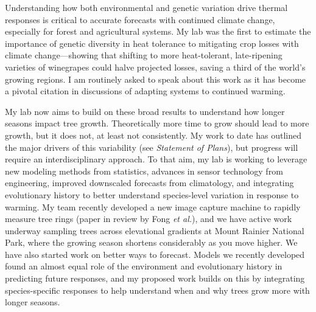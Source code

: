 \documentclass[11pt,letter,oneside]{article}
\begin{document}
Understanding how both environmental and genetic variation drive thermal responses is critical to accurate forecasts with continued climate change, especially for forest and agricultural systems. My lab was the first to estimate the importance of genetic diversity in heat tolerance to mitigating crop losses with climate change---showing that shifting to more heat-tolerant, late-ripening varieties of winegrapes could halve projected losses, saving a third of the world's growing regions. I am routinely asked to speak about this work as it has become a pivotal citation in discussions of adapting systems to continued warming.

My lab now aims to build on these broad results to understand how longer seasons impact tree growth. Theoretically more time to grow should lead to more growth, but it does not, at least not consistently. My work to date has outlined the major drivers of this variability (see \emph{Statement of Plans}), but progress will require an interdisciplinary approach. To that aim, my lab is working to leverage new modeling methods from statistics, advances in sensor technology from engineering, improved downscaled forecasts from climatology, and integrating evolutionary history to better understand species-level variation in response to warming. My team recently developed a new image capture machine to rapidly measure tree rings (paper in review by Fong \emph{et al.}), and we have active work underway sampling trees across elevational gradients at Mount Rainier National Park, where the growing season shortens considerably as you move higher. We have also started work on better ways to forecast. Models we recently developed found an almost equal role of the environment and evolutionary history in predicting future responses, and my proposed work builds on this by integrating species-specific responses to help understand when and why trees grow more with longer seasons. 
\end{document}
